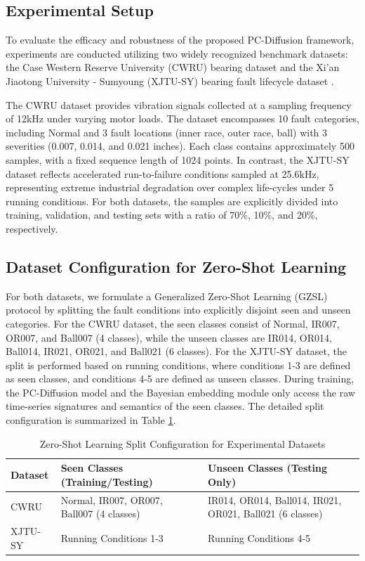 \documentclass[journal]{IEEEtran}
\begin{document}
\subsection{Experimental Setup}
To evaluate the efficacy and robustness of the proposed PC-Diffusion framework, experiments are conducted utilizing two widely recognized benchmark datasets: the Case Western Reserve University (CWRU) bearing dataset \cite{cwru2023bearing} and the Xi'an Jiaotong University - Sumyoung (XJTU-SY) bearing fault lifecycle dataset \cite{wang2018xjtu}. 

The CWRU dataset provides vibration signals collected at a sampling frequency of 12kHz under varying motor loads. The dataset encompasses 10 fault categories, including Normal and 3 fault locations (inner race, outer race, ball) with 3 severities (0.007, 0.014, and 0.021 inches). Each class contains approximately 500 samples, with a fixed sequence length of 1024 points. In contrast, the XJTU-SY dataset reflects accelerated run-to-failure conditions sampled at 25.6kHz, representing extreme industrial degradation over complex life-cycles under 5 running conditions. For both datasets, the samples are explicitly divided into training, validation, and testing sets with a ratio of 70\%, 10\%, and 20\%, respectively.

\subsection{Dataset Configuration for Zero-Shot Learning}
For both datasets, we formulate a Generalized Zero-Shot Learning (GZSL) protocol by splitting the fault conditions into explicitly disjoint seen and unseen categories. For the CWRU dataset, the seen classes consist of Normal, IR007, OR007, and Ball007 (4 classes), while the unseen classes are IR014, OR014, Ball014, IR021, OR021, and Ball021 (6 classes). For the XJTU-SY dataset, the split is performed based on running conditions, where conditions 1-3 are defined as seen classes, and conditions 4-5 are defined as unseen classes. During training, the PC-Diffusion model and the Bayesian embedding module only access the raw time-series signatures and semantics of the seen classes. The detailed split configuration is summarized in Table \ref{tab:zsl_split}.

\begin{table}[!t]
\centering
\caption{Zero-Shot Learning Split Configuration for Experimental Datasets}
\label{tab:zsl_split}
\begin{tabular}{lll}
\toprule
\textbf{Dataset} & \textbf{Seen Classes (Training/Testing)} & \textbf{Unseen Classes (Testing Only)} \\
\midrule
CWRU & Normal, IR007, OR007, Ball007 (4 classes) & IR014, OR014, Ball014, IR021, OR021, Ball021 (6 classes) \\
XJTU-SY & Running Conditions 1-3 & Running Conditions 4-5 \\
\bottomrule
\end{tabular}
\end{table}
\end{document}
